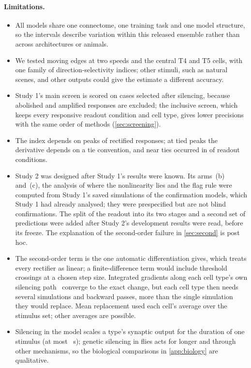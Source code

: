 \paragraph{Limitations.}
\begin{itemize}
  \item All \NModels{} models share one connectome, one training task and one model structure, so the intervals describe variation within this released ensemble rather than across architectures or animals.
  \item We tested moving edges at two speeds and the central T4 and T5 cells, with one family of direction-selectivity indices; other stimuli, such as natural scenes, and other outputs could give the estimate a different accuracy.
  \item Study 1's main screen is scored on cases selected after silencing, because abolished and amplified responses are excluded; the inclusive screen, which keeps every responsive readout condition and cell type, gives lower precisions with the same order of methods (\cref{sec:screening}).
  \item The index depends on peaks of rectified responses; at tied peaks the derivative depends on a tie convention, and near ties occurred in \NearTieReadouts{} of \ReadoutConditions{} readout conditions.
  \item Study 2 was designed after Study 1's results were known. Its arms~(b) and~(c), the analysis of where the nonlinearity lies and the flag rule were computed from Study 1's saved simulations of the confirmation models, which Study 1 had already analysed; they were prespecified but are not blind confirmations. The split of the readout into its two stages and a second set of predictions were added after Study 2's development results were read, before its freeze. The explanation of the second-order failure in \cref{sec:second} is post hoc.
  \item The second-order term is the one automatic differentiation gives, which treats every rectifier as linear; a finite-difference term would include threshold crossings at a chosen step size. Integrated gradients along each cell type's own silencing path~\citep{sundararajan2017axiomatic} converge to the exact change, but each cell type then needs several simulations and backward passes, more than the single simulation they would replace. Mean replacement used each cell's average over the stimulus set; other averages are possible.
  \item Silencing in the model scales a type's synaptic output for the duration of one stimulus (at most \WindowSlow{}~s); genetic silencing in flies acts for longer and through other mechanisms, so the biological comparisons in \cref{app:biology} are qualitative.
\end{itemize}

